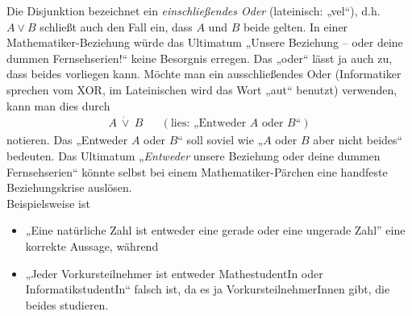 	
\begin{bem}
 Die Disjunktion bezeichnet ein \emph{einschließendes Oder} (lateinisch: „vel“), d.h. $A\lor B$ schließt auch den Fall ein, dass $A$ und $B$ beide gelten. In einer Mathematiker-Beziehung würde das Ultimatum „Unsere Beziehung -- oder deine dummen Fernsehserien!“ keine Besorgnis erregen. Das „oder“ lässt ja auch zu, dass beides vorliegen kann. Möchte man ein ausschließendes Oder (Informatiker sprechen vom XOR, im Lateinischen wird das Wort „aut“ benutzt) verwenden, kann man dies durch
 \begin{align*}
  A\ \dot\lor\ B && (\text{lies: „Entweder $A$ oder $B$“})
\end{align*}
notieren. Das „Entweder $A$ oder $B$“ soll soviel wie „$A$ oder $B$ aber nicht beides“ bedeuten. Das Ultimatum „\emph{Entweder} unsere Beziehung oder deine dummen Fernsehserien“ könnte selbst bei einem Mathematiker-Pärchen eine handfeste Beziehungskrise auslösen. \\
Beispielsweise ist
\begin{itemize}
 \item „Eine natürliche Zahl ist entweder eine gerade oder eine ungerade Zahl” eine korrekte Aussage, während
 \item „Jeder Vorkursteilnehmer ist entweder MathestudentIn oder InformatikstudentIn“ falsch ist, da es ja VorkursteilnehmerInnen gibt, die beides studieren.
\end{itemize}

\end{bem}



